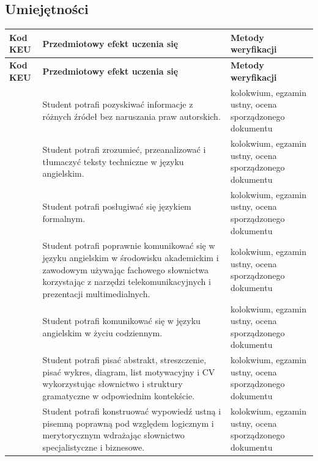 \documentclass[12pt, a4paper]{article}
\newcommand{\thdrule}{\noalign{\global\setlength{\extrarowheight}{0pt}}}
\newcommand{\thdend}{\noalign{\global\setlength{\extrarowheight}{3pt}}}
\begin{document}
\subsection*{Umiejętności}
{\scriptsize
\begin{longtable}{m{1.6cm}m{9.0cm}m{4.2cm}}
\thdrule\toprule
\rowcolor{pjatkRed} {\color{white}\footnotesize\textbf{\vphantom{Ag}Kod KEU}} & {\color{white}\footnotesize\textbf{\vphantom{Ag}Przedmiotowy efekt uczenia się}} & {\color{white}\footnotesize\textbf{\vphantom{Ag}Metody weryfikacji}} \\
\midrule\thdend
\endfirsthead
\thdrule\toprule
\rowcolor{pjatkRed} {\color{white}\footnotesize\textbf{\vphantom{Ag}Kod KEU}} & {\color{white}\footnotesize\textbf{\vphantom{Ag}Przedmiotowy efekt uczenia się}} & {\color{white}\footnotesize\textbf{\vphantom{Ag}Metody weryfikacji}} \\
\midrule\thdend
\endhead
  \rowcolor{tableRowLight}  & Student potrafi pozyskiwać informacje z różnych źródeł bez naruszania praw autorskich. & kolokwium, egzamin ustny, ocena sporządzonego dokumentu \\
  \rowcolor{tableRowAlt}  & Student potrafi zrozumieć, przeanalizować i tłumaczyć teksty techniczne w języku angielskim. & kolokwium, egzamin ustny, ocena sporządzonego dokumentu \\
  \rowcolor{tableRowLight}  & Student potrafi posługiwać się językiem formalnym. & kolokwium, egzamin ustny, ocena sporządzonego dokumentu \\
  \rowcolor{tableRowAlt}  & Student potrafi poprawnie komunikować się w języku angielskim w środowisku akademickim i zawodowym używając fachowego słownictwa korzystając z narzędzi telekomunikacyjnych i prezentacji multimedialnych. & kolokwium, egzamin ustny, ocena sporządzonego dokumentu \\
  \rowcolor{tableRowLight}  & Student potrafi komunikować się w języku angielskim w życiu codziennym. & kolokwium, egzamin ustny, ocena sporządzonego dokumentu \\
  \rowcolor{tableRowAlt}  & Student potrafi pisać abstrakt, streszczenie, pisać wykres, diagram, list motywacyjny i CV wykorzystując słownictwo i struktury gramatyczne w odpowiednim kontekście. & kolokwium, egzamin ustny, ocena sporządzonego dokumentu \\
  \rowcolor{tableRowLight}  & Student potrafi konstruować wypowiedź ustną i pisemną poprawną pod względem logicznym i merytorycznym wdrażając słownictwo specjalistyczne i biznesowe. & kolokwium, egzamin ustny, ocena sporządzonego dokumentu \\
\bottomrule
\end{longtable}}
\end{document}
